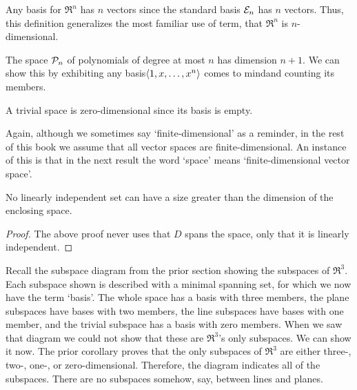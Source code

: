 \begin{example}
Any basis for \( \Re^n \) has \( n \) vectors since the standard basis 
\( {\cal E}_n \) has \( n \) vectors.
Thus, this definition generalizes the most familiar use of 
term, that $\Re^n$ is $n$-dimensional.
\end{example}

\begin{example}
The space \( \mathcal{P}_n \) of polynomials of degree at most $n$ 
has dimension \( n+1 \).
We can show this by exhibiting any basis\Dash $\langle1,x,\dots,x^n\rangle$ 
comes to mind\Dash and counting its members.
\end{example}

\begin{example}
A trivial space is zero-dimensional since its basis is empty.
\end{example}

Again, although we sometimes say `finite-dimensional' as a reminder, in the
rest of this book we assume that all vector spaces are  finite-dimensional.
An instance of this is that in the next result the word `space' 
means `finite-dimensional vector space'.

\begin{corollary}
\label{cor:NoLiSetGreatDim}
No linearly independent set can have a size greater than the dimension of the
enclosing space.
\end{corollary}

\begin{proof}
The above proof never uses that \( D \) spans the space,
only that it is linearly independent.
\end{proof}

\begin{example} \label{ex:RefSubSpDiagram}
Recall the subspace diagram from the prior section showing 
the subspaces of \( \Re^3 \).
Each subspace shown is described with a minimal spanning set, for which we
now have the term `basis'.
The whole space has a basis with three members, 
the plane subspaces have bases with two members,
the line subspaces have bases with one member, 
and the trivial subspace has a basis with zero members.
When we saw that diagram we could not show that these are 
\( \Re^3 \)'s only subspaces.
We can show it now.
The prior corollary proves that 
the only subspaces of \( \Re^3 \) are either three-\hbox{},
two-\hbox{}, one-\hbox{}, or zero-dimensional.
Therefore, the diagram indicates all of the subspaces.
There are no subspaces somehow, say, between lines and planes.
\end{example}


